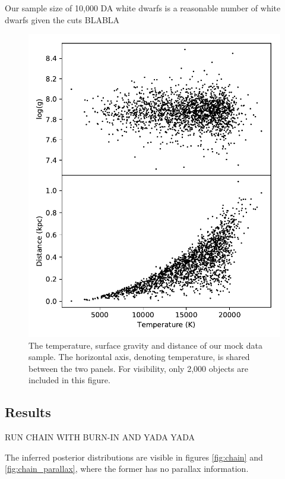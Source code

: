 \documentclass[fleqn,usenatbib]{mnras}
\begin{document}
Our sample size of 10,000 DA white dwarfs is a reasonable number of white dwarfs given the cuts BLABLA

\begin{figure}
	\includegraphics[width=\columnwidth]{10000WDs.pdf}
    \caption{The temperature, surface gravity and distance of our mock data sample. The horizontal axis, denoting temperature, is shared between the two panels. For visibility, only 2,000 objects are included in this figure.}
    \label{fig:10000WDs}
\end{figure}





\subsection{Results}

RUN CHAIN WITH BURN-IN AND YADA YADA

The inferred posterior distributions are visible in figures \ref{fig:chain} and \ref{fig:chain_parallax}, where the former has no parallax information.
\end{document}
